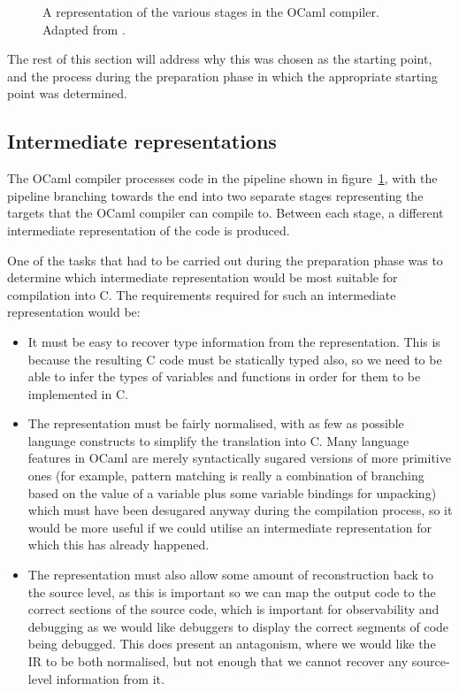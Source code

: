 \begin{figure}
    \centering
    
    \caption{A representation of the various stages in the OCaml compiler. 
    Adapted from \cite[Chapter~22]{realworldocaml}.}
    \label{fig:compilerstages}
\end{figure}

The rest of this section will address why this was chosen as the starting 
point, and the process during the preparation phase in which the appropriate 
starting point was determined.

\subsection{Intermediate representations}

The OCaml compiler processes code in the pipeline shown in
figure~\ref{fig:compilerstages}, with the pipeline branching towards the end
into two separate stages representing the targets that the OCaml compiler can
compile to. Between each stage, a different intermediate representation of the
code is produced.

One of the tasks that had to be carried out during the preparation phase was 
to determine which intermediate representation would be most suitable for 
compilation into C. The requirements required for such an intermediate 
representation would be:

\begin{itemize}

\item It must be easy to recover type information from the representation. This
    is because the resulting C code must be statically typed also, so we need to
    be able to infer the types of variables and functions in order for them to
    be implemented in C.

\item The representation must be fairly normalised, with as few as possible
    language constructs to simplify the translation into C. Many language
    features in OCaml are merely syntactically sugared versions of more
    primitive ones (for example, pattern matching is really a combination of
    branching based on the value of a variable plus some variable bindings for
    unpacking) which must have been desugared anyway during the compilation
    process, so it would be more useful if we could utilise an intermediate
    representation for which this has already happened.

\item The representation must also allow some amount of reconstruction back to
    the source level, as this is important so we can map the output code to the
    correct sections of the source code, which is important for observability
    and debugging as we would like debuggers to display the correct segments of
    code being debugged. This does present an antagonism, where we would like
    the IR to be both normalised, but not enough that we cannot recover any
    source-level information from it.

\end{itemize}

